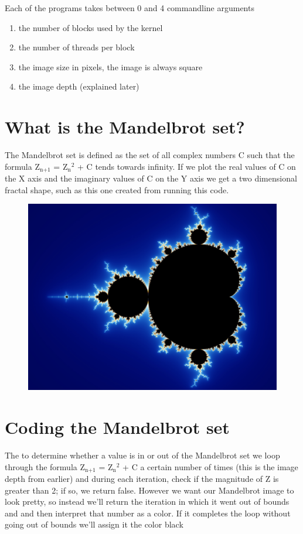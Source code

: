 \documentclass[letterpaper,10pt,openany,oneside]{sphinxmanual}
\begin{document}
Each of the programs takes between 0 and 4 commandline arguments
\begin{enumerate}
\item {} 
the number of blocks used by the kernel

\item {} 
the number of threads per block

\item {} 
the image size in pixels, the image is always square

\item {} 
the image depth (explained later)

\end{enumerate}


\section{What is the Mandelbrot set?}
\label{1-Mandelbrot/Mandelbrot:what-is-the-mandelbrot-set}
The Mandelbrot set is defined as the set of all complex numbers C
such that the formula Z$_{\text{n+1}}$ = Z$_{\text{n}}$$^{\text{2}}$ + C
tends towards infinity. If we plot the real values of C on the X
axis and the imaginary values of C on the Y axis we get a two
dimensional fractal shape, such as this one created from running this code.
\begin{figure}[htbp]
\centering

\includegraphics{set.jpg}
\end{figure}


\section{Coding the Mandelbrot set}
\label{1-Mandelbrot/Mandelbrot:coding-the-mandelbrot-set}
The to determine whether a value is in or out of the Mandelbrot
set we loop through the formula  Z$_{\text{n+1}}$ = Z$_{\text{n}}$$^{\text{2}}$ + C a certain number of times (this is the image depth
from earlier) and during each iteration, check if the magnitude
of Z is greater than 2; if so, we return false. However we want our
Mandelbrot image to look pretty, so instead we'll return the
iteration in which it went out of bounds and and then interpret
that number as a color. If it completes the loop without going
out of bounds we'll assign it the color black
\end{document}
